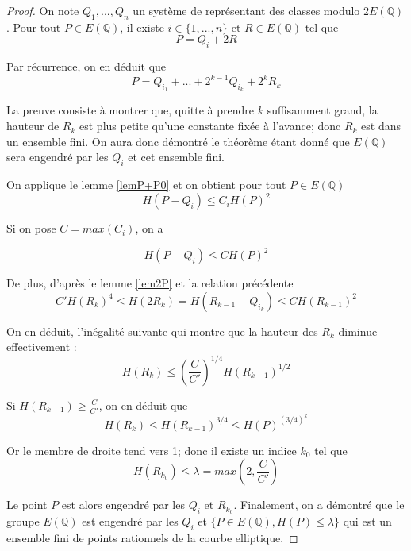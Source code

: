 \documentclass{article}
\begin{document}
\begin{proof}
On note $Q_{1}, ..., Q_{n}$ un système de représentant des classes modulo $2E(\mathbb{Q})$.
Pour tout $P \in E(\mathbb{Q})$, il existe $i\in \{1,...,n\}$ et $R\in E(\mathbb{Q})$ tel que
\begin{equation*}
P=Q_{i}+2R
\end{equation*}

Par récurrence, on en déduit que
\begin{equation*}
P=Q_{i_{1}} + ... + 2^{k-1}Q_{i_{k}} + 2^kR_{k}
\end{equation*}

La preuve consiste à montrer que, quitte à prendre $k$ suffisamment grand, la hauteur de $R_{k}$ est plus petite
qu'une constante fixée à l'avance; donc $R_{k}$ est dans un ensemble fini. On aura donc démontré le théorème
étant donné que $E(\mathbb{Q})$ sera engendré par les $Q_{i}$ et cet ensemble fini.

On applique le lemme \ref{lemP+P0} et on obtient pour tout $P\in E(\mathbb{Q})$
\begin{equation*}
H(P-Q_{i}) \leq C_{i}H(P)^2
\end{equation*}

Si on pose $C=max(C_{i})$, on a

\begin{equation*}
H(P-Q_{i}) \leq CH(P)^2
\end{equation*}

De plus, d'après le lemme \ref{lem2P} et la relation précédente
\begin{equation*}
C'H(R_{k})^4 \leq H(2R_{k}) = H(R_{k-1} - Q_{i_{k}}) \leq CH(R_{k-1})^2
\end{equation*}

On en déduit, l'inégalité suivante qui montre que la hauteur des $R_{k}$ diminue effectivement :
\begin{equation*}
H(R_{k}) \leq (\frac{C}{C'})^{1/4}H(R_{k-1})^{1/2}
\end{equation*}

Si $H(R_{k-1}) \geq \frac{C}{C'}$, on en déduit que
\begin{equation*}
H(R_{k}) \leq H(R_{k-1})^{3/4} \leq H(P)^{(3/4)^k}
\end{equation*}

Or le membre de droite tend vers 1; donc il existe un indice $k_{0}$ tel que
$$H(R_{k_{0}}) \leq \lambda = max(2, \frac{C}{C'})$$

Le point $P$ est alors engendré par les $Q_{i}$ et $R_{k_{0}}$.
Finalement, on a démontré que le groupe $E(\mathbb{Q})$ est engendré par les $Q_{i}$ et 
$\{P\in E(\mathbb{Q}), H(P) \leq \lambda\}$ qui est un ensemble fini de points rationnels de la courbe elliptique.
\end{proof}
\end{document}
